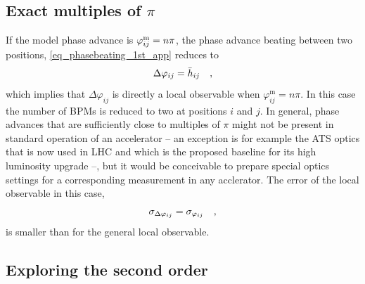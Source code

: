 \subsection{Exact multiples of \texorpdfstring{$\pi$}{pi}}

If the model phase advance is $\varphi_{ij}^\text{m} = n\pi$, the phase advance beating between two positions,
\eqref{eq_phasebeating_1st_app} reduces to
%
\begin{equation}
  \Delta\varphi_{ij} = \bar{h}_{ij}
  \quad ,
  \label{eq_npi_localobs}
\end{equation}
%
which implies that $\Delta \varphi_{ij}$ is directly a local observable when
$\varphi_{ij}^\text{m}=n\pi$.
In this case the number of BPMs is reduced to two at positions $i$ and
$j$.
In general, phase advances that are sufficiently close to multiples of $\pi$ might not be present in
standard operation of an accelerator -- an exception is for example the ATS optics
\cite{Fartoukh2013} that is now used
in LHC and which is the proposed baseline for its high luminosity upgrade --, but it would be conceivable to prepare
special optics settings for a corresponding measurement in any acclerator.
The error of the local observable in this case,
%
\begin{equation}
    \sigma_{\Delta\varphi_{ij}} = \sigma_{\varphi_{ij}}
    \quad ,
    \label{eq_error_npi}
\end{equation}
%
is smaller than for the general local observable.

\subsection{Exploring the second order}
\label{ssec:second_order_phasebeating}

